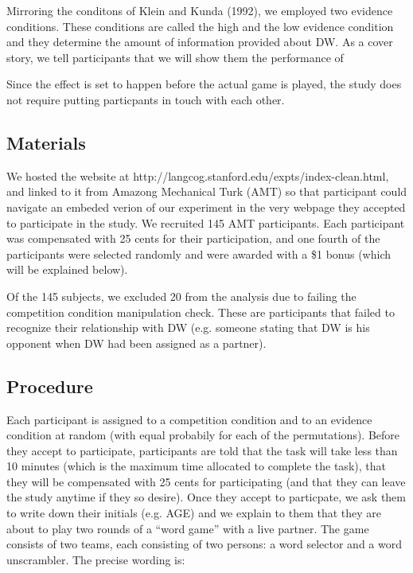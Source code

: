 \documentclass{article}
\begin{document}
Mirroring the conditons of Klein and Kunda (1992), we employed two evidence conditions. These conditions are called the high and the low evidence condition and they determine the amount of information provided about DW. As a cover story, we tell participants that we will show them the performance of

Since the effect is set to happen before the actual game is played, the study does not require putting particpants in touch with each other.

\subsection{Materials}

We hosted the website at http://langcog.stanford.edu/expts/index-clean.html, and linked to it from Amazong Mechanical Turk (AMT) so that participant could navigate an embeded verion of our experiment in the very webpage they accepted to participate in the study. We recruited 145 AMT participants. Each participant was compensated with 25 cents for their participation, and one fourth of the participants were selected randomly and were awarded with a \$1 bonus (which will be explained below).

Of the 145 subjects, we excluded 20 from the analysis due to failing the competition condition manipulation check. These are participants that failed to recognize their relationship with DW (e.g. someone stating that DW is his opponent when DW had been assigned as a partner).


\subsection{Procedure}

Each participant is assigned to a competition condition and to an evidence condition at random (with equal probabily for each of the permutations). Before they accept to participate, participants are told that the task will take less than 10 minutes (which is the maximum time allocated to complete the task), that they will be compensated with 25 cents for participating (and that they can leave the study anytime if they so desire). Once they accept to particpate, we ask them to write down their initials (e.g. AGE) and we explain to them that they are about to play two rounds of a ``word game'' with a live partner. The game consists of two teams, each consisting of two persons: a word selector and a word unscrambler. The precise wording is:
\end{document}

